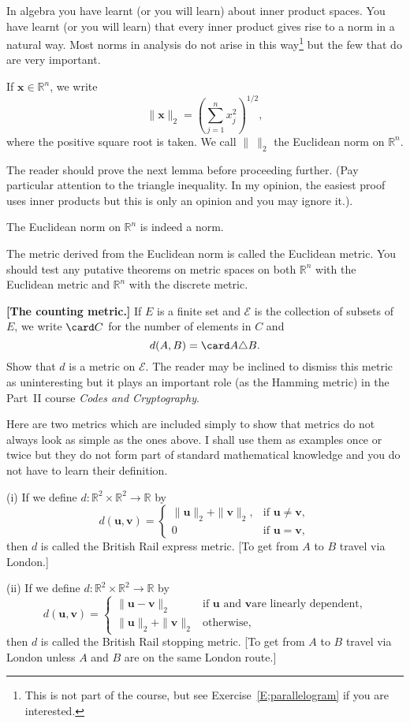 In algebra you have learnt (or you will learn) about inner product
spaces. You have learnt (or you will learn) that every inner product
gives rise to a norm in a natural way. Most norms in analysis
do not arise in this way\footnote{This is not part of the
course, but see Exercise~\ref{E;parallelogram} if you are interested.}
but the few that do are very important.
\begin{definition} If ${\mathbf x}\in{\mathbb R}^{n}$, we write
\[\|{\mathbf x}\|_{2}=\left(\sum_{j=1}^{n}x_{j}^{2}\right)^{1/2},\]
where the positive square root is taken. We call $\|\ \|_{2}$
the Euclidean norm on ${\mathbb R}^{n}$.
\end{definition}
The reader should prove the next lemma before proceeding further.
(Pay particular attention to the triangle inequality.
In my opinion, the easiest proof uses inner products but
this is only an opinion and you may ignore it.).
\begin{lemma} The Euclidean norm on ${\mathbb R}^{n}$ is indeed a norm.
\end{lemma}
The metric derived from the Euclidean norm is called the Euclidean
metric. You should test any putative theorems on metric spaces
on both ${\mathbb R}^{n}$ with the Euclidean metric and
${\mathbb R}^{n}$ with the discrete metric.
\begin{problem}{\bf [The counting metric.]} If $E$ is a finite
set and ${\mathcal E}$ is the collection of subsets of $E$,
we write $\card C$ for the number of elements in $C$ and
\[d(A,B)=\card A\triangle B.\]
Show that $d$ is a metric on ${\mathcal E}$. The reader may be
inclined to dismiss this metric as uninteresting but it plays an
important role (as the Hamming metric) in the Part~II course
\emph{Codes and Cryptography}.
\end{problem}
Here are two metrics which are included simply to show that
metrics do not always look as simple as the ones above.
I shall use them as examples once or twice but
they do not form part of standard mathematical knowledge
and you do not have to learn their definition.
\begin{definition}\label{D;British Rail} (i) If we define
$d:{\mathbb R}^{2}\times{\mathbb R}^{2}\rightarrow{\mathbb R}$
by
\[
d({\mathbf u},{\mathbf v})=
\begin{cases}
\|{\mathbf u}\|_{2}+\|{\mathbf v}\|_{2},&
\text{if ${\mathbf u}\neq{\mathbf v}$},\\
0&\text{if ${\mathbf u}={\mathbf v}$,}
\end{cases}
\]
then $d$ is called the British Rail express metric. [To get from
$A$ to $B$ travel via London.]

(ii) If we define
$d:{\mathbb R}^{2}\times{\mathbb R}^{2}\rightarrow{\mathbb R}$
by
\[
d({\mathbf u},{\mathbf v})=
\begin{cases}
\|{\mathbf u}-{\mathbf v}\|_{2}&\text{if ${\mathbf u}$ and ${\mathbf v}$
are linearly dependent,}\\
\|{\mathbf u}\|_{2}+\|{\mathbf v}\|_{2}&\text{otherwise,}
\end{cases}
\]
then $d$ is called the British Rail stopping metric. [To get from
$A$ to $B$ travel via London unless $A$ and $B$ are on the same London
route.]
\end{definition}

